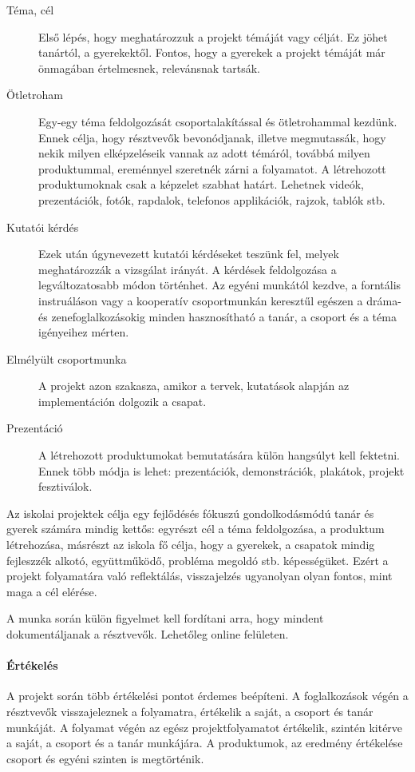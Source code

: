 \begin{description}
  \item[Téma, cél] Első lépés, hogy meghatározzuk a projekt témáját vagy célját. Ez jöhet tanártól, a gyerekektől. Fontos, hogy a gyerekek a projekt témáját már önmagában értelmesnek, relevánsnak tartsák.

  \item [Ötletroham]  Egy-egy téma feldolgozását csoportalakítással és ötletrohammal kezdünk. Ennek célja, hogy résztvevők bevonódjanak, illetve megmutassák, hogy nekik milyen elképzeléseik vannak az adott témáról, továbbá milyen produktummal, ereménnyel szeretnék zárni a folyamatot. A létrehozott produktumoknak csak a képzelet szabhat határt. Lehetnek videók, prezentációk, fotók, rapdalok, telefonos applikációk, rajzok, tablók stb.

  \item [Kutatói kérdés] Ezek után úgynevezett kutatói kérdéseket teszünk fel, melyek meghatározzák a vizsgálat irányát. A kérdések feldolgozása a legváltozatosabb módon történhet. Az egyéni munkától kezdve, a forntális instruáláson vagy a kooperatív csoportmunkán keresztűl egészen a dráma- és zenefoglalkozásokig minden hasznosítható a tanár, a csoport és a téma igényeihez mérten.
  \item [Elmélyült csoportmunka] A projekt azon szakasza, amikor a tervek, kutatások alapján az implementáción dolgozik a csapat.
  \item [Prezentáció] A létrehozott produktumokat bemutatására külön hangsúlyt kell fektetni. Ennek több módja is lehet: prezentációk, demonstrációk, plakátok, projekt fesztiválok.
\end{description}

Az iskolai projektek célja egy fejlődésés fókuszú gondolkodásmódú tanár és gyerek számára mindig kettős: egyrészt cél a téma feldolgozása, a produktum létrehozása, másrészt az iskola fő célja, hogy a gyerekek, a csapatok mindig fejleszzék alkotó, együttműködő, probléma megoldó stb. képességüket. Ezért a projekt folyamatára való reflektálás, visszajelzés ugyanolyan olyan fontos, mint maga a cél elérése.

A munka során külön figyelmet kell fordítani arra, hogy mindent dokumentáljanak a résztvevők. Lehetőleg online felületen.
\paragraph{Értékelés} A projekt során több értékelési pontot érdemes beépíteni. A foglalkozások végén a résztvevők visszajeleznek a folyamatra, értékelik a saját, a csoport és tanár munkáját. A folyamat végén az egész projektfolyamatot értékelik, szintén kitérve a saját, a csoport és a tanár munkájára. A produktumok, az eredmény értékelése csoport és egyéni szinten is megtörténik.

